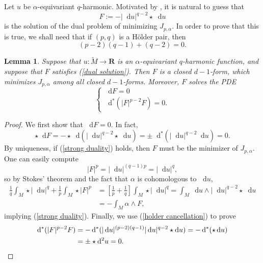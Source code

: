 \documentclass[reqno,11pt]{amsart}
\newcommand{\RR}{\mathbf{R}}
\newcommand*\dif{\mathop{}\!\mathrm{d}}
\newtheorem{lemma}[theorem]{Lemma}
\theoremstyle{definition}
\numberwithin{equation}{section}
\begin{document}
Let $u$ be $\alpha$-equivariant $q$-harmonic.
Motivated by \cite[\S3.1]{daskalopoulos2020transverse}, it is natural to guess that 
\begin{equation}\label{dual solution}
F := - |\dif u|^{q - 2} \star \dif u
\end{equation}
is the solution of the dual problem of minimizing $J_{p, \alpha}$.
In order to prove that this is true, we shall need that if $(p, q)$ is a H\"older pair, then
\begin{equation}\label{holder cancellation}
	(p - 2)(q - 1) + (q - 2) = 0.
\end{equation}

\begin{lemma}\label{dual to u is minimizer}
Suppose that $u: \tilde M \to \RR$ is an $\alpha$-equivariant $q$-harmonic function, and suppose that $F$ satisfies (\ref{dual solution}).
Then $F$ is a closed $d - 1$-form, which minimizes $J_{p, \alpha}$ among all closed $d - 1$-forms.
Moreover, $F$ solves the PDE 
\begin{equation}\label{pMaxwell}
\begin{cases}
	\dif F = 0 \\
	\dif^* (|F|^{p - 2} F) = 0.
\end{cases}
\end{equation}
\end{lemma}
\begin{proof}
We first show that $\dif F = 0$.
In fact, 
$$\star \dif F = - \star \dif(|\dif u|^{q - 2} \star \dif u) = \pm \dif^*(|\dif u|^{q - 2} \dif u) = 0.$$
By uniqueness, if (\ref{strong duality}) holds, then $F$ must be the minimizer of $J_{p, \alpha}$.
One can easily compute 
$$|F|^p = |\dif u|^{(q - 1)p} = |\dif u|^q,$$
so by Stokes' theorem and the fact that $\alpha$ is cohomologous to $\dif u$,
\begin{align*}
\frac{1}{q} \int_M \star |\dif u|^q + \frac{1}{p} \int_M \star |F|^p&
= \left[\frac{1}{p} + \frac{1}{q}\right] \int_M \star |\dif u|^q
= \int_M \dif u \wedge |\dif u|^{q - 2} \star \dif u \\
&= -\int_M \alpha \wedge F,
\end{align*}
implying (\ref{strong duality}).
Finally, we use (\ref{holder cancellation}) to prove
\begin{align*}
\dif^*(|F|^{p - 2} F) &= - \dif^*(|\dif u|^{(p - 2)(q - 1)} |\dif u|^{q - 2} \star \dif u) = - \dif^*(\star \dif u) \\
&= \pm \star \dif^2 u = 0. \qedhere 
\end{align*}
\end{proof}
\end{document}
